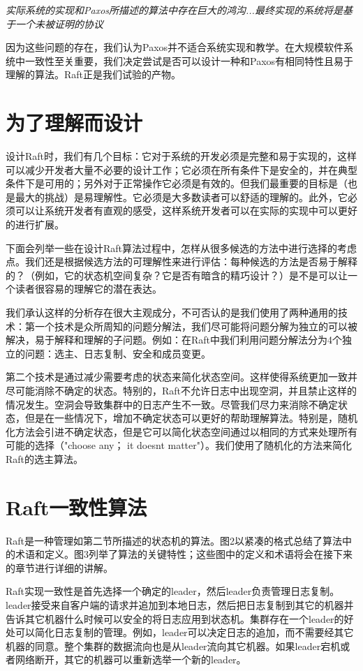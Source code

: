 \documentclass[journal]{IEEEtran}
\begin{document}
\textit{实际系统的实现和Paxos所描述的算法中存在巨大的鸿沟...最终实现的系统将是基于一个未被证明的协议}


因为这些问题的存在，我们认为Paxos并不适合系统实现和教学。在大规模软件系统中一致性至关重要，我们决定尝试是否可以设计一种和Paxos有相同特性且易于理解的算法。Raft正是我们试验的产物。




\section{为了理解而设计}
设计Raft时，我们有几个目标：它对于系统的开发必须是完整和易于实现的，这样可以减少开发者大量不必要的设计工作；它必须在所有条件下是安全的，并在典型条件下是可用的；另外对于正常操作它必须是有效的。但我们最重要的目标是（也是最大的挑战）是易理解性。它必须是大多数读者可以舒适的理解的。此外，它必须可以让系统开发者有直观的感受，这样系统开发者可以在实际的实现中可以更好的进行扩展。

下面会列举一些在设计Raft算法过程中，怎样从很多候选的方法中进行选择的考虑点。我们还是根据候选方法的可理解性来进行评估：每种候选的方法是否易于解释的？（例如，它的状态机空间复杂？它是否有暗含的精巧设计？）是不是可以让一个读者很容易的理解它的潜在表达。


我们承认这样的分析存在很大主观成分，不可否认的是我们使用了两种通用的技术：第一个技术是众所周知的问题分解法，我们尽可能将问题分解为独立的可以被解决，易于解释和理解的子问题。例如：在Raft中我们利用问题分解法分为4个独立的问题：选主、日志复制、安全和成员变更。


第二个技术是通过减少需要考虑的状态来简化状态空间。这样使得系统更加一致并尽可能消除不确定的状态。特别的，Raft不允许日志中出现空洞，并且禁止这样的情况发生。空洞会导致集群中的日志产生不一致。尽管我们尽力来消除不确定状态，但是在一些情况下，增加不确定状态可以更好的帮助理解算法。特别是，随机化方法会引进不确定状态，但是它可以简化状态空间通过以相同的方式来处理所有可能的选择（"choose any； it doesnt matter"）。我们使用了随机化的方法来简化Raft的选主算法。


\section{Raft一致性算法}
Raft是一种管理如第二节所描述的状态机的算法。图2以紧凑的格式总结了算法中的术语和定义。图3列举了算法的关键特性；这些图中的定义和术语将会在接下来的章节进行详细的讲解。


Raft实现一致性是首先选择一个确定的leader，然后leader负责管理日志复制。leader接受来自客户端的请求并追加到本地日志，然后把日志复制到其它的机器并告诉其它机器什么时候可以安全的将日志应用到状态机。集群存在一个leader的好处可以简化日志复制的管理。例如，leader可以决定日志的追加，而不需要经其它机器的同意。整个集群的数据流向也是从leader流向其它机器。如果leader宕机或者网络断开，其它的机器可以重新选举一个新的leader。
\end{document}
